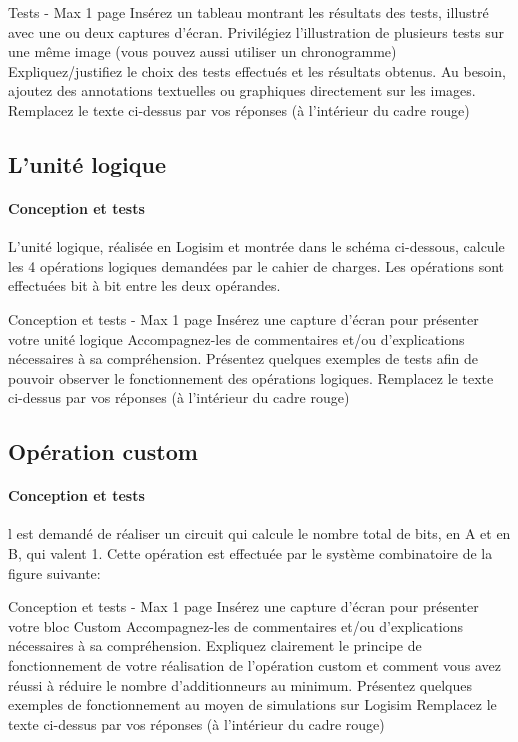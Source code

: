 \documentclass[a4paper]{article}
\begin{document}
\begin{tcolorbox}[colframe=Monokaimagenta,colback=white]
Tests - Max 1 page 
Insérez  un tableau montrant les résultats des tests, illustré avec une ou deux captures d’écran. Privilégiez l’illustration de plusieurs tests sur une même image (vous pouvez aussi utiliser un chronogramme)
Expliquez/justifiez le choix des tests effectués et les résultats obtenus.
Au besoin, ajoutez des annotations textuelles ou graphiques directement sur les images.
Remplacez le texte ci-dessus par vos réponses (à l’intérieur du cadre rouge)
\end{tcolorbox}

\subsection{L'unité logique}
\label{logique}

\paragraph{Conception et tests}
L’unité logique, réalisée en Logisim et montrée dans le schéma ci-dessous, calcule les 4 opérations logiques demandées par le cahier de charges. Les opérations sont effectuées bit à bit entre les deux opérandes.

\begin{tcolorbox}[colframe=Monokaimagenta,colback=white]
Conception et tests - Max 1 page 
Insérez une capture d’écran pour présenter votre unité logique
Accompagnez-les de commentaires et/ou d’explications nécessaires à sa compréhension.
Présentez quelques exemples de tests  afin de pouvoir observer le fonctionnement des opérations logiques.
Remplacez le texte ci-dessus par vos réponses (à l’intérieur du cadre rouge)
\end{tcolorbox}

\subsection{Opération custom}
\label{custom}

\paragraph{Conception et tests}
l est demandé de réaliser un circuit qui calcule le nombre total de bits, en A et en B, qui valent 1. Cette opération est effectuée par le système combinatoire de la figure suivante:

\begin{tcolorbox}[colframe=Monokaimagenta,colback=white]
Conception et tests -  Max 1 page 
Insérez une capture d’écran pour présenter votre bloc Custom
Accompagnez-les de commentaires et/ou d’explications nécessaires à sa compréhension.
Expliquez clairement le principe de fonctionnement de votre réalisation de l’opération custom et comment vous avez réussi à réduire le nombre d’additionneurs au minimum.
Présentez quelques exemples de fonctionnement au moyen de simulations sur Logisim
Remplacez le texte ci-dessus par vos réponses (à l’intérieur du cadre rouge)
\end{tcolorbox}
\end{document}
